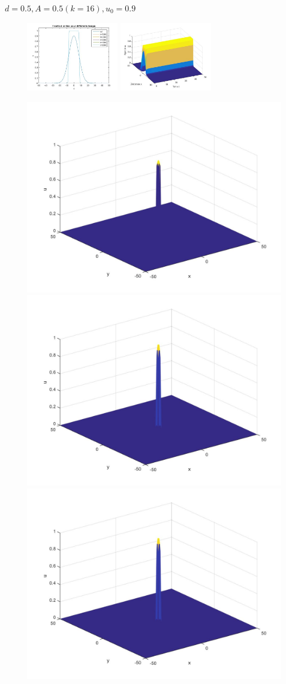 \documentclass[10pt]{beamer}
\begin{document}
\begin{frame}{$\ d=0.5, A=0.5 (k=16), u_0=0.9$}{}
\begin{figure}[H]
	\centering
	\includegraphics[width=0.40\linewidth, height=3cm]{Allee/F2333}\hfill
	\includegraphics[width=0.55\linewidth, height=3cm]{Allee/F4333}
\end{figure}
\begin{figure}[H]
	\centering
	\includegraphics[width=0.3\linewidth]{Allee/333__1_}\hfill
    \includegraphics[width=0.3\linewidth]{Allee/333__2_}\hfill
	\includegraphics[width=0.3\linewidth]{Allee/333__3_}
\end{figure}
\end{frame}
\end{document}
